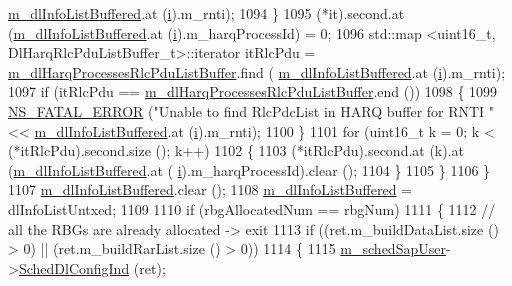 \begin{DoxyCode}
      \hyperlink{classns3_1_1TdTbfqFfMacScheduler_aabf2460c78d16c5202cdcda020ba06dd}{m\_dlInfoListBuffered}.at (\hyperlink{bernuolliDistribution_8m_a6f6ccfcf58b31cb6412107d9d5281426}{i}).m\_rnti);
1094             \}
1095           (*it).second.at (\hyperlink{classns3_1_1TdTbfqFfMacScheduler_aabf2460c78d16c5202cdcda020ba06dd}{m\_dlInfoListBuffered}.at (\hyperlink{bernuolliDistribution_8m_a6f6ccfcf58b31cb6412107d9d5281426}{i}).m\_harqProcessId) = 0;
1096           std::map <uint16\_t, DlHarqRlcPduListBuffer\_t>::iterator itRlcPdu =  
      \hyperlink{classns3_1_1TdTbfqFfMacScheduler_a997b6649f2a69dd389d9a4381707b755}{m\_dlHarqProcessesRlcPduListBuffer}.find (
      \hyperlink{classns3_1_1TdTbfqFfMacScheduler_aabf2460c78d16c5202cdcda020ba06dd}{m\_dlInfoListBuffered}.at (\hyperlink{bernuolliDistribution_8m_a6f6ccfcf58b31cb6412107d9d5281426}{i}).m\_rnti);
1097           \textcolor{keywordflow}{if} (itRlcPdu == \hyperlink{classns3_1_1TdTbfqFfMacScheduler_a997b6649f2a69dd389d9a4381707b755}{m\_dlHarqProcessesRlcPduListBuffer}.end ())
1098             \{
1099               \hyperlink{group__fatal_ga5131d5e3f75d7d4cbfd706ac456fdc85}{NS\_FATAL\_ERROR} (\textcolor{stringliteral}{"Unable to find RlcPdcList in HARQ buffer for RNTI "} << 
      \hyperlink{classns3_1_1TdTbfqFfMacScheduler_aabf2460c78d16c5202cdcda020ba06dd}{m\_dlInfoListBuffered}.at (\hyperlink{bernuolliDistribution_8m_a6f6ccfcf58b31cb6412107d9d5281426}{i}).m\_rnti);
1100             \}
1101           \textcolor{keywordflow}{for} (uint16\_t k = 0; k < (*itRlcPdu).second.size (); k++)
1102             \{
1103               (*itRlcPdu).second.at (k).at (\hyperlink{classns3_1_1TdTbfqFfMacScheduler_aabf2460c78d16c5202cdcda020ba06dd}{m\_dlInfoListBuffered}.at (
      \hyperlink{bernuolliDistribution_8m_a6f6ccfcf58b31cb6412107d9d5281426}{i}).m\_harqProcessId).clear ();
1104             \}
1105         \}
1106     \}
1107   \hyperlink{classns3_1_1TdTbfqFfMacScheduler_aabf2460c78d16c5202cdcda020ba06dd}{m\_dlInfoListBuffered}.clear ();
1108   \hyperlink{classns3_1_1TdTbfqFfMacScheduler_aabf2460c78d16c5202cdcda020ba06dd}{m\_dlInfoListBuffered} = dlInfoListUntxed;
1109 
1110   \textcolor{keywordflow}{if} (rbgAllocatedNum == rbgNum)
1111     \{
1112       \textcolor{comment}{// all the RBGs are already allocated -> exit}
1113       \textcolor{keywordflow}{if} ((ret.m\_buildDataList.size () > 0) || (ret.m\_buildRarList.size () > 0))
1114         \{
1115           \hyperlink{classns3_1_1TdTbfqFfMacScheduler_a8f5689c5d8af1b40e97dacfce14f605a}{m\_schedSapUser}->\hyperlink{classns3_1_1FfMacSchedSapUser_a28f8484af5a32a45ee6c0e51770d83f7}{SchedDlConfigInd} (ret);

\end{DoxyCode}
